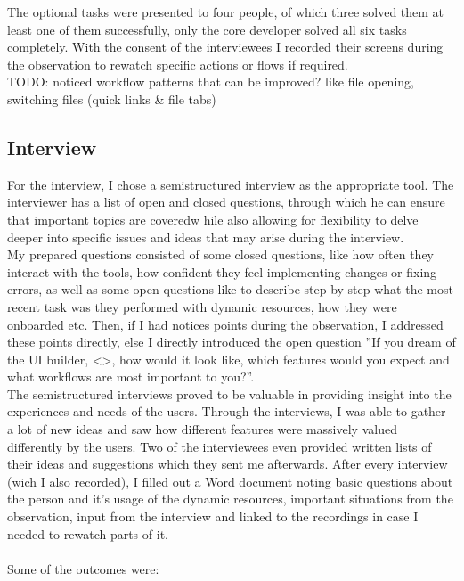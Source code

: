The optional tasks were presented to four people, of which three solved them at least one of them successfully, only the core developer solved all six tasks completely.
With the consent of the interviewees I recorded their screens during the observation to rewatch specific actions or flows if required.
\\
TODO: noticed workflow patterns that can be improved? like file opening, switching files (quick links \& file tabs)

\subsection{Interview}
\label{subsec:interview}
For the interview, I chose a semistructured interview as the appropriate tool. The interviewer has a list of open and closed questions, through which he can ensure that important topics are coveredw hile also allowing for flexibility to delve deeper into specific issues and ideas that may arise during the interview.
\\
My prepared questions consisted of some closed questions, like how often they interact with the tools, how confident they feel implementing changes or fixing errors, as well as some open questions like to describe step by step what the most recent task was they performed with dynamic resources, how they were onboarded etc.
Then, if I had notices points during the observation, I addressed these points directly, else I directly introduced the open question ''If you dream of the UI builder, <>, how would it look like, which features would you expect and what workflows are most important to you?''.
\\
The semistructured interviews proved to be valuable in providing insight into the experiences and needs of the users. Through the interviews, I was able to gather a lot of new ideas and saw how different features were massively valued differently by the users. Two of the interviewees even provided written lists of their ideas and suggestions which they sent me afterwards. After every interview (wich I also recorded), I filled out a Word document noting basic questions about the person and it's usage of the dynamic resources, important situations from the observation, input from the interview and linked to the recordings in case I needed to rewatch parts of it.
\\\\
Some of the outcomes were:
